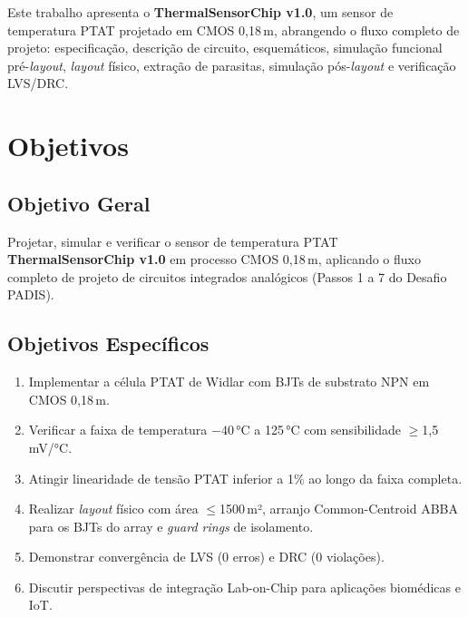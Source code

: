 \documentclass[12pt,a4paper]{article}
\begin{document}
Este trabalho apresenta o \textbf{ThermalSensorChip v1.0}, um sensor de temperatura PTAT
projetado em CMOS 0,18\,\textmu m, abrangendo o fluxo completo de projeto: especificação,
descrição de circuito, esquemáticos, simulação funcional pré-\textit{layout}, \textit{layout}
físico, extração de parasitas, simulação pós-\textit{layout} e verificação LVS/DRC.

\section{Objetivos}

\subsection{Objetivo Geral}

Projetar, simular e verificar o sensor de temperatura PTAT \textbf{ThermalSensorChip v1.0}
em processo CMOS 0,18\,\textmu m, aplicando o fluxo completo de projeto de circuitos
integrados analógicos (Passos 1 a 7 do Desafio PADIS).

\subsection{Objetivos Específicos}

\begin{enumerate}[leftmargin=2em,label=\textbf{OE\arabic*.}]
  \item Implementar a célula PTAT de Widlar com BJTs de substrato NPN em CMOS 0,18\,\textmu m.
  \item Verificar a faixa de temperatura $-40$\,°C a 125\,°C com sensibilidade $\geq$1,5\,mV/°C.
  \item Atingir linearidade de tensão PTAT inferior a 1\% ao longo da faixa completa.
  \item Realizar \textit{layout} físico com área $\leq$1500\,\textmu m², arranjo Common-Centroid
        ABBA para os BJTs do array e \textit{guard rings} de isolamento.
  \item Demonstrar convergência de LVS (0 erros) e DRC (0 violações).
  \item Discutir perspectivas de integração Lab-on-Chip para aplicações biomédicas e IoT.
\end{enumerate}

\end{document}
